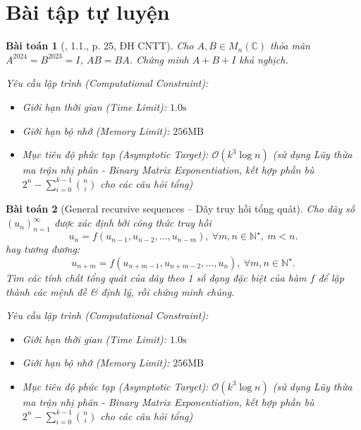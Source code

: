 \documentclass{article}
\newtheorem{baitoan}{Bài toán}
\begin{document}
\section{Bài tập tự luyện}

\begin{baitoan}[\cite{VMS_VMC2024}, 1.1., p. 25, ĐH CNTT]
	Cho $A,B\in M_n(\mathbb{C})$ thỏa mãn $A^{2024} = B^{2023} = I$, $AB = BA$. Chứng minh $A + B + I$ khả nghịch.

    \vspace{0.5em}
    \emph{Yêu cầu lập trình (Computational Constraint):}
    \begin{itemize}
        \item Giới hạn thời gian (Time Limit): $1.0\mathrm{s}$
        \item Giới hạn bộ nhớ (Memory Limit): $256\mathrm{MB}$
        \item Mục tiêu độ phức tạp (Asymptotic Target): $\mathcal{O}(k^3 \log n)$ (sử dụng Lũy thừa ma trận nhị phân - Binary Matrix Exponentiation, kết hợp phần bù $2^n - \sum_{i=0}^{k-1} \binom{n}{i}$ cho các câu hỏi tổng)
    \end{itemize}
\end{baitoan}


\begin{baitoan}[General recursive sequences -- Dãy truy hồi tổng quát]
	Cho dãy số $(u_n)_{n=1}^\infty$ được xác định bởi công thức truy hồi
	\begin{equation}
		\boxed{u_n = f(u_{n-1},u_{n-2},\ldots,u_{n-m}),\ \forall m,n\in\mathbb{N}^\star,\ m < n.}
	\end{equation}
	hay tương đương:
	\begin{equation*}
		\boxed{u_{n + m} = f(u_{n + m - 1},u_{n+m-2},\ldots,u_n),\ \forall m,n\in\mathbb{N}^\star.}
	\end{equation*}
	Tìm các tính chất tổng quát của dãy theo 1 số dạng đặc biệt của hàm $f$ để lập thành các mệnh đề \& định lý, rồi chứng minh chúng.

    \vspace{0.5em}
    \emph{Yêu cầu lập trình (Computational Constraint):}
    \begin{itemize}
        \item Giới hạn thời gian (Time Limit): $1.0\mathrm{s}$
        \item Giới hạn bộ nhớ (Memory Limit): $256\mathrm{MB}$
        \item Mục tiêu độ phức tạp (Asymptotic Target): $\mathcal{O}(k^3 \log n)$ (sử dụng Lũy thừa ma trận nhị phân - Binary Matrix Exponentiation, kết hợp phần bù $2^n - \sum_{i=0}^{k-1} \binom{n}{i}$ cho các câu hỏi tổng)
    \end{itemize}
\end{baitoan}
\end{document}
